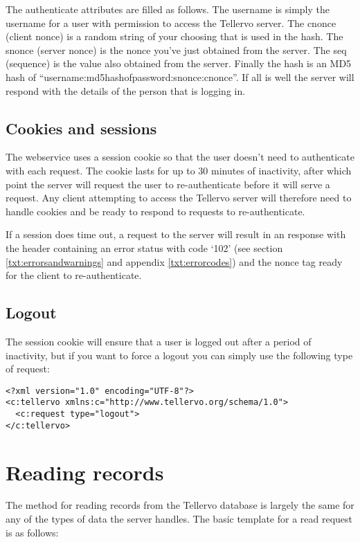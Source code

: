 The authenticate attributes are filled as follows.  The username is simply the username for a user with permission to access the Tellervo server.  The cnonce (client nonce) is a random string of your choosing that is used in the hash.  The snonce (server nonce) is the nonce you've just obtained from the server.  The seq (sequence) is the value also obtained from the server.  Finally the hash is an MD5 hash of ``username:md5hashofpassword:snonce:cnonce''.  If all is well the server will respond with the details of the person that is logging in.

\subsection{Cookies and sessions}
The webservice uses a session cookie so that the user doesn't need to authenticate with each request.  The cookie lasts for up to 30 minutes of inactivity, after which point the server will request the user to re-authenticate before it will serve a request.  Any client attempting to access the Tellervo server will therefore need to handle cookies and be ready to respond to requests to re-authenticate.  

If a session does time out, a request to the server will result in an response with the header containing an error status with code `102' (see section \ref{txt:errorsandwarnings} and appendix \ref{txt:errorcodes}) and the nonce tag ready for the client to re-authenticate.  

\subsection{Logout}

The session cookie will ensure that a user is logged out after a period of inactivity, but if you want to force a logout you can simply use the following type of request:

\begin{lstlisting}
<?xml version="1.0" encoding="UTF-8"?>
<c:tellervo xmlns:c="http://www.tellervo.org/schema/1.0">
  <c:request type="logout">
</c:tellervo> 
\end{lstlisting}


\section{Reading records}

The method for reading records from the Tellervo database is largely the same for any of the types of data the server handles.  The basic template for a read request is as follows:

